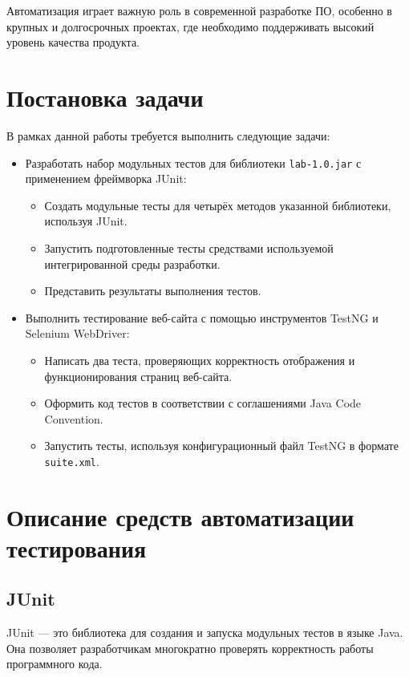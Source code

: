 \documentclass{article}[14pt]
\begin{document}
Автоматизация играет важную роль в современной разработке ПО, особенно в крупных и долгосрочных проектах, где необходимо поддерживать 
высокий уровень качества продукта.

\pagebreak

\section{Постановка задачи}

В рамках данной работы требуется выполнить следующие задачи:

\begin{itemize}
\item Разработать набор модульных тестов для библиотеки \texttt{lab-1.0.jar} с применением фреймворка JUnit:
  \begin{itemize}
    \item Создать модульные тесты для четырёх методов указанной библиотеки, используя JUnit.
    \item Запустить подготовленные тесты средствами используемой интегрированной среды разработки.
    \item Представить результаты выполнения тестов.
  \end{itemize}

\item Выполнить тестирование веб-сайта с помощью инструментов TestNG и Selenium WebDriver:
  \begin{itemize}
    \item Написать два теста, проверяющих корректность отображения и функционирования страниц веб-сайта.
    \item Оформить код тестов в соответствии с соглашениями Java Code Convention.
    \item Запустить тесты, используя конфигурационный файл TestNG в формате \texttt{suite.xml}.
  \end{itemize}
\end{itemize}

\pagebreak

\section{Описание средств автоматизации тестирования}

\subsection{JUnit}

JUnit — это библиотека для создания и запуска модульных тестов в языке Java. Она позволяет разработчикам многократно проверять корректность работы программного кода.
\end{document}
